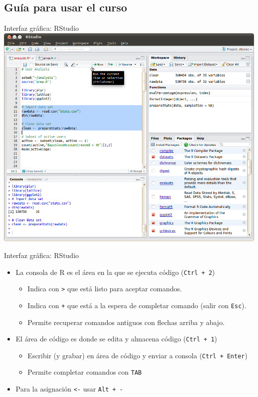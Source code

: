 \documentclass[xcolor={usenames,svgnames,dvipsnames}]{beamer}
\begin{document}
\subsection{Guía para usar el curso}
\label{sec-1-2}

\begin{frame}[label=sec-1-2-1]{Interfaz gráfica: RStudio}
\includegraphics[width=.9\linewidth]{figs/rstudio-ubuntu.png}
\end{frame}

\begin{frame}[fragile,label=sec-1-2-2]{Interfaz gráfica: RStudio}
 \begin{itemize}
\item La consola de R es el área en la que se ejecuta código (\texttt{Ctrl + 2})
\begin{itemize}
\item Indica con \texttt{>} que está listo para aceptar comandos.
\item Indica con \texttt{+} que está a la espera de completar comando (salir con \texttt{Esc}).
\item Permite recuperar comandos antiguos con flechas arriba y abajo.
\end{itemize}
\item El área de código es donde se edita y almacena código (\texttt{Ctrl + 1})
\begin{itemize}
\item Escribir (y grabar) en área de código y enviar a consola (\texttt{Ctrl + Enter})
\item Permite completar comandos con \texttt{TAB}
\end{itemize}
\item Para la asignación \texttt{<-} usar \texttt{Alt + -}
\end{itemize}
\end{frame}
\end{document}
